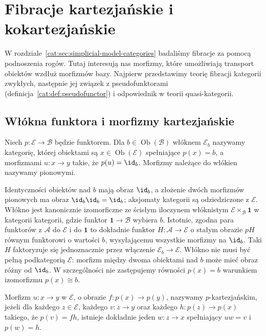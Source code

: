 \section{Fibracje kartezjańskie i kokartezjańskie}\label{cat:sec:cartesian-fibrations}

W rozdziale~\ref{cat:sec:simplicial-model-categories} badaliśmy fibracje za pomocą podnoszenia rogów. Tutaj interesują nas morfizmy, które umożliwiają transport obiektów wzdłuż morfizmów bazy. Najpierw przedstawimy teorię fibracji kategorii zwykłych, następnie jej związek z pseudofunktorami (definicja~\ref{cat:def:pseudofunctor}) i odpowiednik w teorii quasi-kategorii.

\subsection{Włókna funktora i morfizmy kartezjańskie}

\begin{definicja}\label{cat:def:ordinary-functor-fiber}
Niech $p:\mathcal E\to\mathcal B$ będzie funktorem. Dla $b\in\operatorname{Ob}(\mathcal B)$ włóknem $\mathcal E_b$ nazywamy kategorię, której obiektami są $x\in\operatorname{Ob}(\mathcal E)$ spełniające $p(x)=b$, a morfizmami $u:x\to y$ takie, że $p(u)=\id_b$. Morfizmy należące do włókien nazywamy pionowymi.
\end{definicja}
Identyczności obiektów nad $b$ mają obraz $\id_b$, a złożenie dwóch morfizmów pionowych ma obraz $\id_b\id_b=\id_b$; aksjomaty kategorii są odziedziczone z $\mathcal E$. Włókno jest kanonicznie izomorficzne ze ścisłym iloczynem włóknistym $\mathcal E\times_{\mathcal B}\mathbf 1$ w kategorii kategorii, gdzie funktor $\mathbf 1\to\mathcal B$ wybiera $b$. Istotnie, zgodna para funktorów z $\mathcal A$ do $\mathcal E$ i do $\mathbf 1$ to dokładnie funktor $H:\mathcal A\to\mathcal E$ o stałym obrazie $pH$ równym funktorowi o wartości $b$, wysyłającemu wszystkie morfizmy na $\id_b$. Taki $H$ faktoryzuje się jednoznacznie przez włączenie $\mathcal E_b\to\mathcal E$. Włókno nie musi być pełną podkategorią $\mathcal E$: morfizm między dwoma obiektami nad $b$ może mieć obraz różny od $\id_b$. W szczególności nie zastępujemy równości $p(x)=b$ warunkiem izomorfizmu $p(x)\cong b$.

\begin{definicja}\label{cat:def:ordinary-cartesian-arrow}
Morfizm $u:x\to y$ w $\mathcal E$, o obrazie $f:p(x)\to p(y)$, nazywamy $p$-kartezjańskim, jeżeli dla każdego $z\in\mathcal E$, każdego $v:z\to y$ oraz każdego $h:p(z)\to p(x)$ takiego, że $p(v)=fh$, istnieje dokładnie jeden $w:z\to x$ spełniający $uw=v$ i $p(w)=h$.
\end{definicja}

